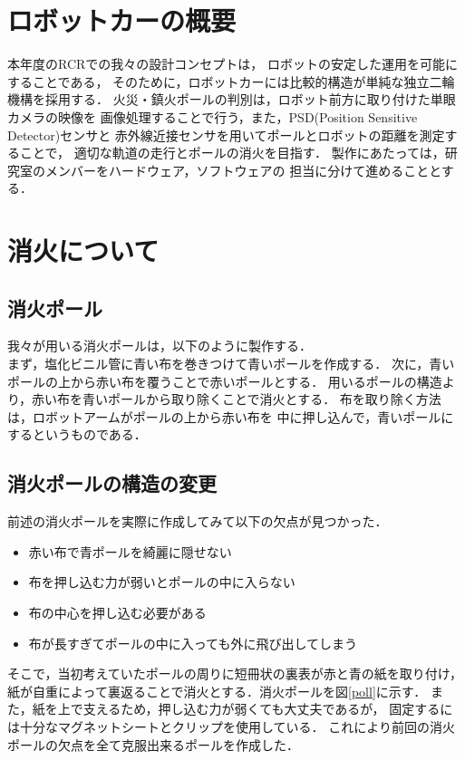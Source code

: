 \documentclass[11pt,a4]{jsarticle}
\begin{document}

\newpage
\section{ロボットカーの概要}
本年度のRCRでの我々の設計コンセプトは，
ロボットの安定した運用を可能にすることである，
そのために，ロボットカーには比較的構造が単純な独立二輪機構を採用する．
火災・鎮火ポールの判別は，ロボット前方に取り付けた単眼カメラの映像を
画像処理することで行う，また，PSD(Position Sensitive Detector)センサと
赤外線近接センサを用いてポールとロボットの距離を測定することで，
適切な軌道の走行とポールの消火を目指す．
製作にあたっては，研究室のメンバーをハードウェア，ソフトウェアの
担当に分けて進めることとする．


\section{消火について}
\subsection{消火ポール}
我々が用いる消火ポールは，以下のように製作する．\\
まず，塩化ビニル管に青い布を巻きつけて青いポールを作成する．
次に，青いポールの上から赤い布を覆うことで赤いポールとする．
用いるポールの構造より，赤い布を青いポールから取り除くことで消火とする．
布を取り除く方法は，ロボットアームがポールの上から赤い布を
中に押し込んで，青いポールにするというものである．

\newpage

\subsection{消火ポールの構造の変更}
前述の消火ポールを実際に作成してみて以下の欠点が見つかった．
\begin{itemize}
 \item 	赤い布で青ポールを綺麗に隠せない
 \item  布を押し込む力が弱いとポールの中に入らない
 \item  布の中心を押し込む必要がある
 \item  布が長すぎてポールの中に入っても外に飛び出してしまう
\end{itemize}
そこで，当初考えていたポールの周りに短冊状の裏表が赤と青の紙を取り付け，
紙が自重によって裏返ることで消火とする．消火ポールを図\ref{poll}に示す．
また，紙を上で支えるため，押し込む力が弱くても大丈夫であるが，
固定するには十分なマグネットシートとクリップを使用している．
これにより前回の消火ポールの欠点を全て克服出来るポールを作成した．
\end{document}
